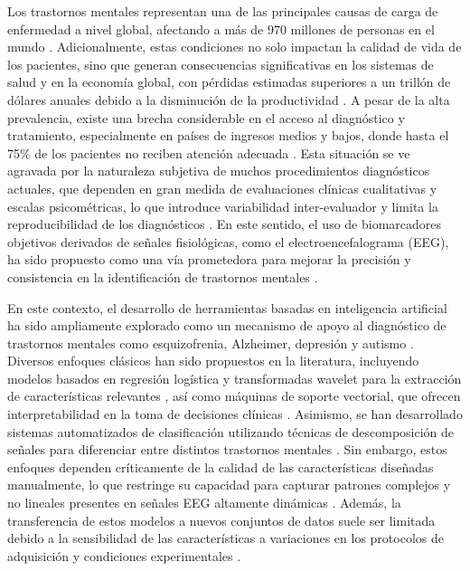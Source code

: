 Los trastornos mentales representan una de las principales causas de carga de enfermedad a nivel global, afectando a más de 970 millones de personas en el mundo \cite{Dehghan-Bonari2023}. Adicionalmente, estas condiciones no solo impactan la calidad de vida de los pacientes, sino que generan consecuencias significativas en los sistemas de salud y en la economía global, con pérdidas estimadas superiores a un trillón de dólares anuales debido a la disminución de la productividad \cite{WHO2025}. A pesar de la alta prevalencia, existe una brecha considerable en el acceso al diagnóstico y tratamiento, especialmente en países de ingresos medios y bajos, donde hasta el 75\% de los pacientes no reciben atención adecuada \cite{WHOmhGAP}. Esta situación se ve agravada por la naturaleza subjetiva de muchos procedimientos diagnósticos actuales, que dependen en gran medida de evaluaciones clínicas cualitativas y escalas psicométricas, lo que introduce variabilidad inter-evaluador y limita la reproducibilidad de los diagnósticos \cite{DiForti2025}. En este sentido, el uso de biomarcadores objetivos derivados de señales fisiológicas, como el electroencefalograma (EEG), ha sido propuesto como una vía prometedora para mejorar la precisión y consistencia en la identificación de trastornos mentales \cite{Newson2018,Bosl2011}.

En este contexto, el desarrollo de herramientas basadas en inteligencia artificial ha sido ampliamente explorado como un mecanismo de apoyo al diagnóstico de trastornos mentales como esquizofrenia, Alzheimer, depresión y autismo \cite{Arbabshirani2017137}. Diversos enfoques clásicos han sido propuestos en la literatura, incluyendo modelos basados en regresión logística y transformadas wavelet para la extracción de características relevantes \cite{10.1007/978-3-030-89691-1_41}, así como máquinas de soporte vectorial, que ofrecen interpretabilidad en la toma de decisiones clínicas \cite{Vaidya202051}. Asimismo, se han desarrollado sistemas automatizados de clasificación utilizando técnicas de descomposición de señales para diferenciar entre distintos trastornos mentales \cite{Tor2021}. Sin embargo, estos enfoques dependen críticamente de la calidad de las características diseñadas manualmente, lo que restringe su capacidad para capturar patrones complejos y no lineales presentes en señales EEG altamente dinámicas \cite{Craik2019}. Además, la transferencia de estos modelos a nuevos conjuntos de datos suele ser limitada debido a la sensibilidad de las características a variaciones en los protocolos de adquisición y condiciones experimentales \cite{Li2025DG}.

